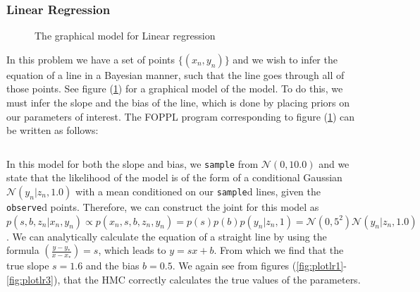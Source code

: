 \documentclass[twoside]{article}
\begin{document}
\subsubsection{Linear Regression}
\begin{figure}[ht]
	\begin{center}
		
	\end{center}
	\caption{The graphical model for Linear regression}
    \label{fig:lrgraph}
\end{figure}
In this problem we have a set of points $\{(x_{n},y_{n})\}$ and we wish to infer the equation of a line in a Bayesian manner, such that the line goes through all of those points. See figure (\ref{fig:lrgraph}) for a graphical model of the model. To do this, we must infer the slope and the bias of the line, which is done by placing priors on our parameters of interest. The FOPPL program corresponding to figure (\ref{fig:lrgraph}) can be written as follows:\inputminted{clojure}{code/linearregression.clj}In this model for both the slope and bias, we \texttt{sample} from $\mathcal{N}(0,10.0)$ and we state that the likelihood of the model is of the form of a conditional Gaussian $\mathcal{N}(y_{n}| z_{n}, 1.0)$ with a mean conditioned on our \texttt{sample}d lines, given the \texttt{observe}d points. Therefore, we can construct the joint for this model as $ p(s,b,z_{n} | x_{n}, y_{n}) \propto p(x_{n},s,b,z_{n}, y_{n}) = p(s)p(b)p(y_{n} | z_{n}, 1) =\mathcal{N}(0,5^{2})\mathcal{N}(y_{n}|z_{n},1.0)$. We can analytically calculate the equation of a straight line by using the formula $\left(\frac{y - y_{*}}{x - x_{*}}\right) = s$, which leads to $y = sx + b$. From which we find that the true slope $s = 1.6$ and the bias $b = 0.5$. We again see from figures (\ref{fig:plotlr1}-\ref{fig:plotlr3}), that the HMC correctly calculates the true values of the parameters.\\
\end{document}
